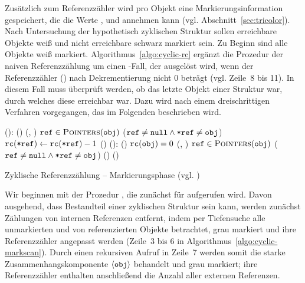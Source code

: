 Zusätzlich zum Referenzzähler wird pro Objekt eine Markierungsinformation gespeichert, die die Werte ,  und  annehmen kann (vgl. Abschnitt~\ref{sec:tricolor}).
Nach Untersuchung der hypothetisch zyklischen Struktur sollen erreichbare Objekte weiß und nicht erreichbare schwarz markiert sein.
Zu Beginn sind alle Objekte weiß markiert.
Algorithmus~\ref{algo:cyclic-rc} ergänzt die Prozedur  der naiven Referenzzählung um einen \ELSE-Fall, der ausgelöst wird, wenn der Referenzzähler () nach Dekrementierung nicht $0$ beträgt (vgl. Zeile~8 bis 11).
In diesem Fall muss überprüft werden, ob  das letzte Objekt einer Struktur war, durch welches diese erreichbar war.
Dazu wird nach einem dreischrittigen Verfahren vorgegangen, das im Folgenden beschrieben wird.

\begin{algorithm}[h]
\begin{algorithmic}[1]
	\State {}():
	\State \quad \IF {}()
	\State \quad \quad {}(, )
	\State \quad \quad \FOREACH $\texttt{ref} \in \textsc{Pointers}(\texttt{obj})$
	\State \quad \quad \quad \IF ($\texttt{ref} \neq \texttt{null} \wedge \texttt{*ref} \neq \texttt{obj}$)	
	\State \quad \quad \quad \quad $\texttt{rc}(\texttt{*ref}) \gets \texttt{rc}(\texttt{*ref})-1$ 
	\State \quad \quad \quad \quad {}()	
	\Statex
	\State {}():
	\State \quad \IF {}()
	\State \quad \quad \IF $\texttt{rc}(\texttt{obj}) = 0$	
	\State \quad \quad \quad {}(, )
	\State \quad \quad \quad \FOREACH $\texttt{ref} \in \textsc{Pointers}(\texttt{obj})$
	\State \quad \quad \quad \quad \IF ($\texttt{ref} \neq \texttt{null} \wedge \texttt{*ref} \neq \texttt{obj}$)
	\State \quad \quad \quad \quad \quad {}()	
	\State \quad \quad \ELSE {}()	
\end{algorithmic}
\caption[Zyklische Referenzzählung -- Markierungsphase]{Zyklische Referenzzählung -- Markierungsphase (vgl. \cite[S. 32f]{martinez1990})}
\label{algo:cyclic-markscan}
\end{algorithm}

Wir beginnen mit der Prozedur , die zunächst für  aufgerufen wird.
Davon ausgehend, dass  Bestandteil einer zyklischen Struktur sein kann, werden zunächst Zählungen von internen Referenzen entfernt, indem per Tiefensuche alle unmarkierten und von  referenzierten Objekte betrachtet, grau markiert und ihre Referenzzähler angepasst werden (Zeile~3 bis 6 in Algorithmus~\ref{algo:cyclic-markscan}).
Durch einen rekursiven Aufruf in Zeile~7 werden somit die starke Zusammenhangskomponente $\left\langle\texttt{obj}\right\rangle$ behandelt und grau markiert; ihre Referenzzähler enthalten anschließend die Anzahl aller externen Referenzen.

